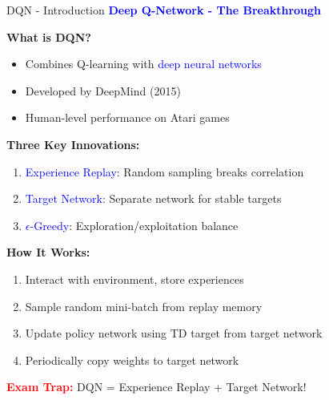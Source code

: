\documentclass[8pt]{beamer}
\begin{document}
	\begin{frame}{DQN - Introduction}
		\fontsize{6.5}{7.5}\selectfont
		\textcolor{blue}{\textbf{Deep Q-Network - The Breakthrough}}
		
		\textbf{What is DQN?}
		\begin{itemize}
			\item Combines Q-learning with \textcolor{blue}{deep neural networks}
			\item Developed by DeepMind (2015)
			\item Human-level performance on Atari games
		\end{itemize}
		
		\textbf{Three Key Innovations:}
		\begin{enumerate}
			\item \textcolor{blue}{Experience Replay}: Random sampling breaks correlation
			\item \textcolor{blue}{Target Network}: Separate network for stable targets
			\item \textcolor{blue}{$\epsilon$-Greedy}: Exploration/exploitation balance
		\end{enumerate}
		
		\textbf{How It Works:}
		\begin{enumerate}
			\item Interact with environment, store experiences
			\item Sample random mini-batch from replay memory
			\item Update policy network using TD target from target network
			\item Periodically copy weights to target network
		\end{enumerate}
		
		\textcolor{red}{\textbf{Exam Trap:}} DQN = Experience Replay + Target Network!
	\end{frame}
	
\end{document}
